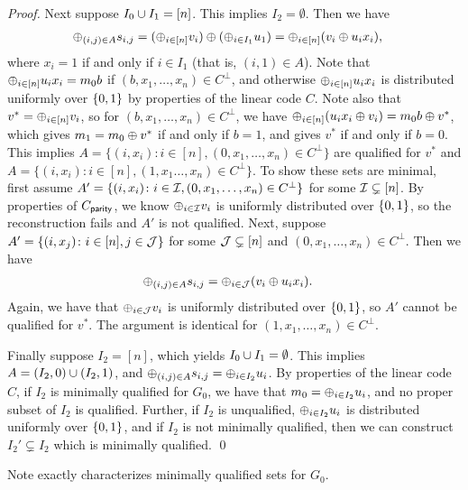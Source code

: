 \begin{proof}
	Next suppose $I_0 \cup I_1 = [n]$. 
	This implies $I_2 = \emptyset$.
	Then we have
	\begin{align*}
		\oplus_{(i,j)\in A} s_{i,j} &= (\oplus_{i \in [n]} v_i) \oplus (\oplus_{i \in I_1} u_1) = \oplus_{i \in [n]} (v_i \oplus u_ix_i),
	\end{align*}
	where $x_i = 1$ if and only if $i \in I_1$ (that is, $(i,1) \in A$).
	Note that $\oplus_{i \in [n]} u_i x_i = m_0b$ if $(b, x_1,\dotsc, x_n) \in C^\perp$, and otherwise $\oplus_{i\in [n]} u_ix_i$ is distributed uniformly over ${\{0,1\}}$ by properties of the linear code $C$.
	Note also that $v^* = \oplus_{i \in [n]} v_i$, so for $(b, x_1,\dotsc, x_n) \in C^\perp$, we have $\oplus_{i \in [n]} (u_ix_i \oplus v_i) = m_0b \oplus v^*$, which gives $m_1 = m_0 \oplus v^*$ if and only if $b = 1$, and gives $v^*$ if and only if $b = 0$.
	This implies $A = \{ (i, x_i)\colon i \in [n], (0,x_1,\dotsc, x_n) \in C^\perp \}$
	are qualified for $v^*$ and $A = \{ (i,x_i) \colon i\in[n], (1,x_1\dotsc,x_n) \in C^\perp \}$.
	To show these sets are minimal, first assume $A' = \{ (i, x_i) \colon i \in {\mathcal I},  (0,x_1,\dotsc, x_n) \in C^\perp\}$ for some ${\mathcal I} \subsetneq [n]$.
	By properties of $C_\mathsf{parity}$, we know $\oplus_{i \in {\mathcal I}} v_i$ is uniformly distributed over ${\{0,1\}}$, so the reconstruction fails and $A'$ is not qualified.
	Next, suppose $A' = \{(i, x_j)\colon i \in [n], j \in {\mathcal J} \}$ for some ${\mathcal J} \subsetneq [n]$ and $(0, x_1,\dotsc,x_n) \in C^\perp$.
	Then we have
	\begin{align*}
		\oplus_{(i,j)\in A} s_{i,j} &= \oplus_{i \in {\mathcal J}} (v_i \oplus u_ix_i).
	\end{align*}
	Again, we have that $\oplus_{i \in {\mathcal J}} v_i$ is uniformly distributed over ${\{0,1\}}$, so $A'$ cannot be qualified for $v^*$.
	The argument is identical for $(1,x_1,\dotsc, x_n) \in C^\perp$.
	
	Finally suppose $I_2 = [n]$, which yields $I_0 \cup I_1 = \emptyset$.
	This implies $A = (I_2, 0) \cup (I_2, 1)$, and $\oplus_{(i,j)\in A}s_{i,j} = \oplus_{i \in I_2} u_i$.
	By properties of the linear code $C$, if $I_2$ is minimally qualified for $G_0$, we have that $m_0 = \oplus_{i \in I_2} u_i$, and no proper subset of $I_2$ is qualified.
	Further, if $I_2$ is unqualified, $\oplus_{i \in I_2} u_i$ is distributed uniformly over ${\{0,1\}}$, and if $I_2$ is not minimally qualified, then we can construct $I_2' \subsetneq I_2$ which is minimally qualified. \qed
\end{proof}
Note  exactly characterizes minimally qualified sets for $G_0$.
















